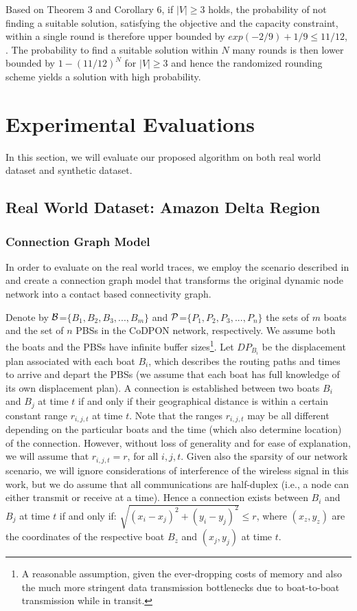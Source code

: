 \documentclass[conference]{IEEEtran}
\begin{document}
Based on Theorem 3 and Corollary 6, if $|V| \ge 3$ holds, the probability of not finding a suitable solution, satisfying the objective and the capacity constraint, within a single round is therefore upper bounded by $exp(−2/9) + 1/9 \le 11/12$, . The probability to find a suitable solution within $N$ many rounds is then lower bounded by $1 - (11/12)^N$ for $|V| \ge 3$ and hence the randomized rounding scheme yields a solution with high probability. 



\section{Experimental Evaluations}
In this section, we will evaluate our proposed algorithm on both real world dataset and synthetic dataset. 

\subsection{Real World Dataset: Amazon Delta Region}

\subsubsection{Connection Graph Model}

In order to evaluate on the real world traces, we employ the scenario described in \cite{LiuJAERC15} and create a connection graph model that transforms the original dynamic node network into a contact based connectivity graph.

Denote by $\cal B$=$\{B_1,B_2,B_3, ... ,B_m\}$ and $\cal P$=$\{P_1,P_2,P_3, ... ,P_n\}$ the sets of $m$ boats and the set of $n$ PBSs in the CoDPON network, respectively. We assume both the boats and the PBSs have infinite buffer sizes\footnote{A reasonable assumption, given the ever-dropping costs of memory and also the much more stringent data transmission bottlenecks due to boat-to-boat transmission while in transit.}. Let $DP_{B_i}$ be the displacement plan associated with each boat $B_i$, which describes the routing paths and times to arrive and depart the PBSs (we assume that each boat has full knowledge of its own displacement plan). A connection is established between two boats $B_i$ and $B_j$ at time $t$ if and only if their geographical distance is within a certain constant range $r_{i,j,t}$ at time $t$. Note that the ranges $r_{i,j,t}$ may be all different depending on the particular boats and the time (which also determine location) of the connection. However, without loss of generality and for ease of explanation, we will assume that $r_{i,j,t}=r$, for all $i,j,t$.  Given also the sparsity of our network scenario, we will ignore considerations of interference of the wireless signal in this work, but we do assume that all communications are half-duplex (i.e., a node can either transmit or receive at a time). Hence a connection exists between $B_i$ and $B_j$ at time $t$ if and only if: $\sqrt{(x_i - x_j)^2 + (y_i - y_j)^2} \leq r$, where $(x_z,y_z)$ are the coordinates of the respective boat  $B_z$ and $(x_j,y_j)$ at time $t$.
\end{document}
